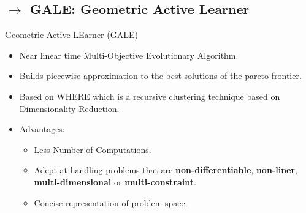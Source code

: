 \documentclass[10pt]{beamer}
\begin{document}
\subsection{$\rightarrow$ GALE: Geometric Active Learner}
\begin{frame}{Geometric Active LEarner (GALE)}
    \begin{itemize}
    \item<1-> Near linear time Multi-Objective Evolutionary Algorithm.
    \item<2-> Builds piecewise approximation to the best solutions of the pareto frontier.
    \item<3-> Based on WHERE which is a recursive clustering technique based on Dimensionality Reduction.
    \item<4-> Advantages:
    \begin{itemize}
        \item<4-> Less Number of Computations.
        \item<4-> Adept at handling problems that are \textbf{non-differentiable}, \textbf{non-liner}, \textbf{multi-dimensional} or \textbf{multi-constraint}.
        \item<4-> Concise representation of problem space.
    \end{itemize}
    \end{itemize}
\end{frame}
\end{document}
